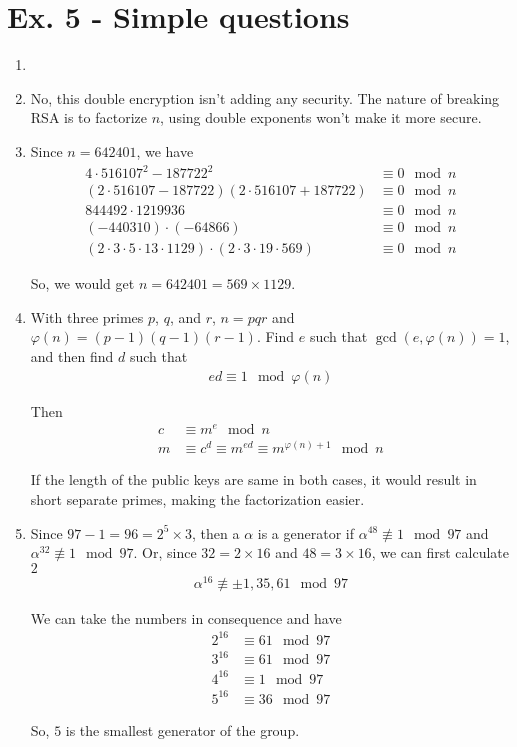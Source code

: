 \documentclass[11pt,a4paper]{article}
\begin{document}
\section*{Ex. 5 - Simple questions}
\begin{enumerate}
\item 

\item No, this double encryption isn't adding any security. The nature of breaking RSA is to factorize $n$, using double exponents won't make it more secure.

\item Since $n = 642401$, we have
\begin{align*}
	4 \cdot 516107^{2} - 187722^{2} &\equiv 0 \mod n \\
	(2 \cdot 516107 - 187722)(2 \cdot 516107 + 187722) &\equiv 0 \mod n \\
	844492 \cdot 1219936 &\equiv 0 \mod n \\
	(-440310) \cdot (-64866) &\equiv0 \mod n \\
	(2 \cdot 3 \cdot 5 \cdot 13 \cdot 1129) \cdot (2 \cdot 3 \cdot 19 \cdot 569) &\equiv 0 \mod n
\end{align*}
\par So, we would get $n = 642401 = 569 \times 1129$.

\item With three primes $p$, $q$, and $r$, $n = pqr$ and $\varphi(n) = (p-1)(q-1)(r-1)$. Find $e$ such that $\gcd(e, \varphi(n)) = 1$, and then find $d$ such that
\begin{align*}
	ed \equiv 1 \mod \varphi(n)
\end{align*}
\par Then
\begin{align*}
c &\equiv m^{e} \mod n \\
m &\equiv c^{d} \equiv m^{ed} \equiv m^{\varphi(n) + 1} \mod n
\end{align*}
\par If the length of the public keys are same in both cases, it would result in short separate primes, making the factorization easier.

\item Since $97 - 1 = 96 = 2^{5} \times 3$, then a $\alpha$ is a generator if $\alpha^{48} \not\equiv 1 \mod 97$ and $\alpha^{32} \not\equiv 1 \mod 97$. Or, since $32 = 2 \times 16$ and $48 = 3 \times 16$, we can first calculate $2$
\begin{align*}
	\alpha^{16} \not\equiv \pm 1, 35, 61 \mod 97
\end{align*}
\par We can take the numbers in consequence and have
\begin{align*}
	2^{16} &\equiv 61 \mod 97 \\
	3^{16} &\equiv 61 \mod 97 \\
	4^{16} &\equiv 1  \mod 97 \\
	5^{16} &\equiv 36 \mod 97
\end{align*}
\par So, $5$ is the smallest generator of the group.


\end{enumerate}
\end{document}
